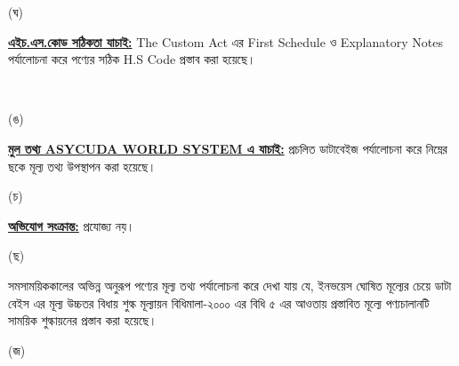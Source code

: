 \documentclass[12pt]{article}
\begin{document}
\begin{minipage}[t]{0.05\linewidth}
(ঘ)
\end{minipage}
\begin{minipage}[t]{0.90\linewidth}
\underline{\textbf{এইচ.এস.কোড সঠিকতা যাচাই:}}
The Custom  Act এর First Schedule ও
Explanatory Notes পর্যালোচনা করে পণ্যের সঠিক
H.S Code প্রস্তাব করা হয়েছে।
\end{minipage}
\\
\begin{minipage}[t]{0.05\linewidth}
\hspace{1em}
\end{minipage}
\begin{minipage}[t]{0.05\linewidth}
(ঙ)
\end{minipage}
\begin{minipage}[t]{0.90\linewidth}
\underline{\textbf{মুল তথ্য ASYCUDA WORLD
SYSTEM এ যাচাই:}}
প্রচলিত ডাটাবেইজ পর্যালোচনা করে নিম্নের ছকে
মূল্য তথ্য উপস্থাপন করা হয়েছে।
\\
\end{minipage}
\begin{minipage}[t]{0.05\linewidth}
\hspace{1em}
\end{minipage}
\begin{minipage}[t]{0.05\linewidth}
(চ)
\end{minipage}
\begin{minipage}[t]{0.90\linewidth}
\underline{\textbf{অভিযোগ সংক্রান্ত:}}
প্রযোজ্য নয়।
\\
\end{minipage}
\begin{minipage}[t]{0.05\linewidth}
\hspace{1em}
\end{minipage}
\begin{minipage}[t]{0.05\linewidth}
(ছ)
\end{minipage}
\begin{minipage}[t]{0.90\linewidth}
সমসাময়িককালের অভিন্ন অনুরূপ পণ্যের মূল্য
তথ্য পর্যালোচনা করে দেখা যায় যে,
ইনভয়েস ঘোষিত মূল্যের চেয়ে ডাটা বেইস এর
মূল্য উচ্চতর বিধায় শুল্ক মূল্যায়ন বিধিমালা-২০০০
এর বিধি ৫ এর আওতায় প্রস্তাবিত মূল্যে পণ্যচালানটি
সাময়িক শুল্কায়নের প্রস্তাব করা হয়েছে।
\\
\end{minipage}
\begin{minipage}[t]{0.05\linewidth}
\hspace{1em}
\end{minipage}
\begin{minipage}[t]{0.05\linewidth}
(জ)
\end{minipage}
\end{document}

